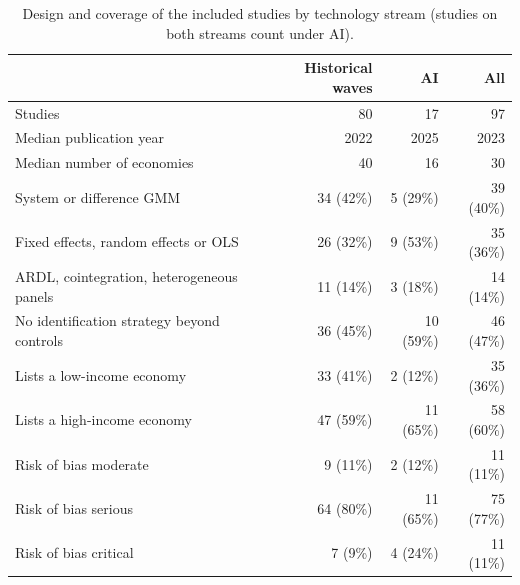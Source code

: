 \begin{table}[ht]\centering\small
\caption{Design and coverage of the included studies by technology stream (studies on both streams count under AI).}\label{tab:design}
\begin{tabular}{@{}lrrr@{}}\toprule & Historical waves & AI & All\\\midrule
Studies & 80 & 17 & 97\\
Median publication year & 2022 & 2025 & 2023\\
Median number of economies & 40 & 16 & 30\\
System or difference GMM & 34 (42\%) & 5 (29\%) & 39 (40\%)\\
Fixed effects, random effects or OLS & 26 (32\%) & 9 (53\%) & 35 (36\%)\\
ARDL, cointegration, heterogeneous panels & 11 (14\%) & 3 (18\%) & 14 (14\%)\\
No identification strategy beyond controls & 36 (45\%) & 10 (59\%) & 46 (47\%)\\
Lists a low-income economy & 33 (41\%) & 2 (12\%) & 35 (36\%)\\
Lists a high-income economy & 47 (59\%) & 11 (65\%) & 58 (60\%)\\
Risk of bias moderate & 9 (11\%) & 2 (12\%) & 11 (11\%)\\
Risk of bias serious & 64 (80\%) & 11 (65\%) & 75 (77\%)\\
Risk of bias critical & 7 (9\%) & 4 (24\%) & 11 (11\%)\\
\bottomrule\end{tabular}\end{table}
